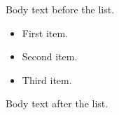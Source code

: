 \documentclass{article}
\begin{document}
Body text before the list.

\begin{itemize}
  \item First item.
  \item Second item.
  \item Third item.
\end{itemize}

Body text after the list.
\end{document}
